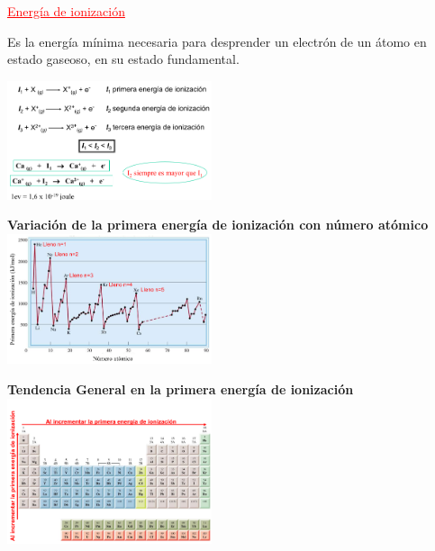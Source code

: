         \begin{center} \textcolor{red}{\underline{Energía de ionización}} \end{center}
            \indent Es la energía mínima necesaria para desprender un electrón de un átomo en estado gaseoso, en su estado fundamental.
            \begin{center} \includegraphics[width=6cm]{./imagenes/energiaDeIonizacion.png} \end{center}
            \begin{center} \textbf{Variación de la primera energía de ionización con número atómico} \\[10pt] \includegraphics[width=6cm]{./imagenes/energiaDeIonizacionVSNumeroAtomico.png} \end{center}

            \begin{center} \textbf{Tendencia General en la primera energía de ionización} \\[10pt] \includegraphics[width=6cm]{./imagenes/tendenciaPrimeraEnergiaDeIonizacion.png} \end{center}

